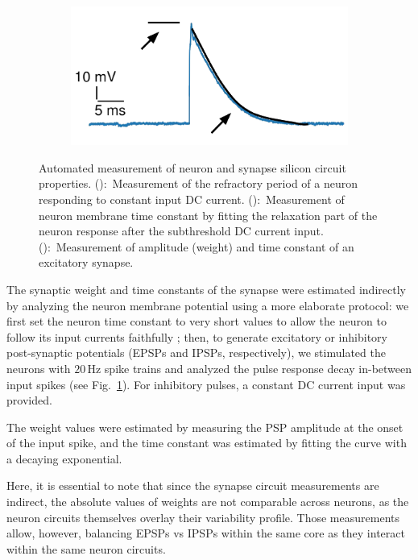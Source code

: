 \begin{figure}[h]
  \begin{subfigure}[b]{.34\textwidth}
  \centering
  \includegraphics[width=\textwidth]{img/chapter4/ampa_tc.pdf}
  \subcaption{}
  \label{fig:ampa_tc}
  \end{subfigure}
  \caption[Automated measurement of neuron and synapse silicon circuit properties]{Automated measurement of neuron and synapse silicon circuit properties.
():~Measurement of the refractory period of a neuron responding to constant input DC current.
():~Measurement of neuron membrane time constant by fitting the relaxation part of the neuron response after the subthreshold DC current input.
():~Measurement of amplitude (weight) and time constant of an excitatory synapse.}
  \label{fig:automated_acquisition}
\end{figure}

The synaptic weight and time constants of the synapse were estimated indirectly by analyzing the neuron membrane potential using a more elaborate protocol: we first set the neuron time constant to very short values to allow the neuron to follow its input currents faithfully%
; then, to generate excitatory or inhibitory post-synaptic potentials (EPSPs and IPSPs, respectively), we stimulated the neurons with $20$\,Hz spike trains and analyzed the pulse response decay in-between input spikes (see Fig.~\ref{fig:ampa_tc}). For inhibitory pulses, a constant DC current input was provided.

The weight values were estimated by measuring the PSP amplitude at the onset of the input spike, and the time constant was estimated by fitting the curve with a decaying exponential.

Here, it is essential to note that since the synapse circuit measurements are indirect, the absolute values of weights are not comparable across neurons, as the neuron circuits themselves overlay their variability profile. Those measurements allow, however, balancing EPSPs vs IPSPs within the same core as they interact within the same neuron circuits.

